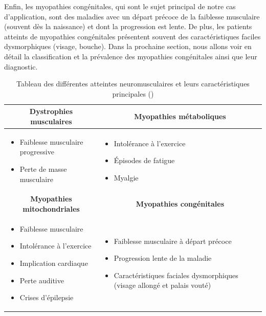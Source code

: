 Enfin, les myopathies congénitales, qui sont le sujet principal de notre cas d'application, sont des maladies avec un départ précoce de la faiblesse musculaire (souvent dès la naissance) et dont la progression est lente. De plus, les patients atteints de myopathies congénitales présentent souvent des caractéristiques faciles dysmorphiques (visage, bouche). Dans la prochaine section, nous allons voir en détail la classification et la prévalence des myopathies congénitales ainsi que leur diagnostic.
\begin{table}[!ht]
\centering
\begin{tabularx}{\textwidth}{|X|X|}
 \hline
\multicolumn{1}{|c|}{\textbf{Dystrophies musculaires}} & \multicolumn{1}{|c|}{\textbf{Myopathies métaboliques}} \\
\hline
\begin{itemize}
\item Faiblesse musculaire progressive
\item Perte de masse musculaire
\end{itemize} &
\begin{itemize}
\item Intolérance à l'exercice
\item Épisodes de fatigue
\item Myalgie
\end{itemize} \\
\hline

\multicolumn{1}{|c|}{\textbf{Myopathies mitochondriales}} & \multicolumn{1}{|c|}{\textbf{Myopathies congénitales}} \\
\hline
\begin{itemize}
\item Faiblesse musculaire
\item Intolérance à l'exercice
\item Implication cardiaque
\item Perte auditive
\item Crises d'épilepsie
\end{itemize} &
\begin{itemize}
\item Faiblesse musculaire à départ précoce
\item Progression lente de la maladie
\item Caractéristiques faciales dysmorphiques (visage allongé et palais vouté)
\end{itemize} \\
\hline
\end{tabularx}

\caption{Tableau des différentes atteintes neuromusculaires et leurs caractéristiques principales (\cite{lornage_identification_2019})}
\label{table:nmd}
\end{table}

